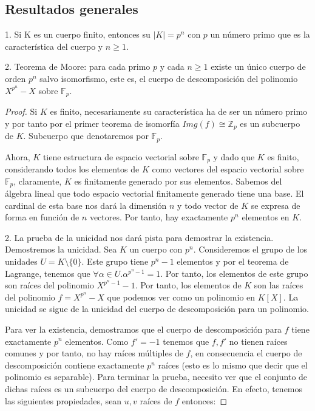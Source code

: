 \subsection{Resultados generales}

\begin{theorem}
1. Si K es un cuerpo finito, entonces su $|K| = p^n$ con $p$ un número primo que es la característica del cuerpo y $n \ge 1$. 

2. Teorema de Moore: para cada primo $p$ y cada $n \ge 1$ existe un único cuerpo de orden $p^n$ salvo isomorfismo, este es, el cuerpo de descomposición del polinomio $X^{p^n} - X$ sobre $\mathbb{F}_p$. 
\end{theorem}
\begin{proof}
Si $K$ es finito, necesariamente su característica ha de ser un número primo y por tanto por el primer teorema de isomorfía $Img(f) \cong \mathbb{Z}_p$ es un subcuerpo de $K$. Subcuerpo que denotaremos por $\mathbb{F}_p$.

Ahora, $K$ tiene estructura de espacio vectorial sobre $\mathbb{F}_p$ y dado que $K$ es finito, considerando todos los elementos de $K$ como vectores del espacio vectorial sobre $\mathbb{F}_p$, claramente, $K$ es finitamente generado por sus elementos. Sabemos del álgebra lineal que todo espacio vectorial finitamente generado tiene una base. El cardinal de esta base nos dará la dimensión $n$ y todo vector de $K$ se expresa de forma en función de $n$ vectores. Por tanto, hay exactamente $p^n$ elementos en $K$. 

2. La prueba de la unicidad nos dará pista para demostrar la existencia. Demostremos la unicidad. Sea $K$ un cuerpo con $p^n$. Consideremos el grupo de los unidades $U = K \setminus \{0\}$. Este grupo tiene $p^n - 1$ elementos y por el teorema de Lagrange, tenemos que $\forall \alpha \in U. \alpha^{p^n - 1} = 1$. Por tanto, los elementos de este grupo son raíces del polinomio $X^{p^n-1}-1$. Por tanto, los elementos de $K$ son las raíces del polinomio $f = X^{p^n}-X$ que podemos ver como un polinomio en $K[X]$. La unicidad se sigue de la unicidad del cuerpo de descomposición para un polinomio.

Para ver la existencia, demostramos que el cuerpo de descomposición para $f$ tiene exactamente $p^n$ elementos. Como $f' = -1$ tenemos que $f,f'$ no tienen raíces comunes y por tanto, no hay raíces múltiples de $f$, en consecuencia el cuerpo de descomposición contiene exactamente $p^n$ raíces (esto es lo mismo que decir que el polinomio es separable). Para terminar la prueba, necesito ver que el conjunto de dichas raíces es un subcuerpo del cuerpo de descomposición. En efecto, tenemos las siguientes propiedades, sean $u,v$ raíces de $f$ entonces:


\end{proof}
